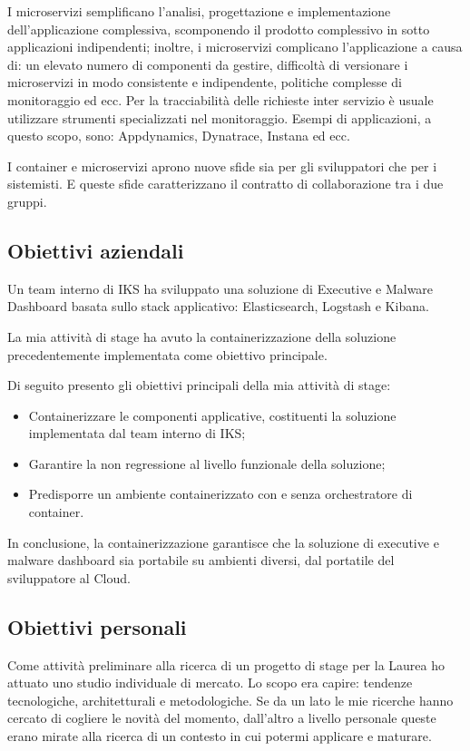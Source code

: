I microservizi semplificano l'analisi, progettazione e implementazione dell'applicazione complessiva, scomponendo il prodotto complessivo in sotto applicazioni indipendenti; inoltre, i microservizi complicano l'applicazione a causa di: un elevato numero di componenti da gestire, difficoltà di versionare i microservizi in modo consistente e indipendente, politiche complesse di monitoraggio ed ecc. Per la tracciabilità delle richieste inter servizio è usuale utilizzare strumenti specializzati nel monitoraggio. Esempi di applicazioni, a questo scopo, sono: Appdynamics, Dynatrace, Instana ed ecc. 

I container e microservizi aprono nuove sfide sia per gli sviluppatori che per i sistemisti. E queste sfide caratterizzano il contratto di collaborazione tra i due gruppi. 




\subsection{Obiettivi aziendali}

Un team interno di IKS ha sviluppato una soluzione di Executive e Malware Dashboard
basata sullo stack applicativo: Elasticsearch, Logstash e Kibana.
 
La mia attività di stage ha avuto la containerizzazione della soluzione precedentemente implementata come obiettivo principale.

Di seguito presento gli obiettivi principali della mia attività di stage:

\begin{itemize}
	\item Containerizzare le componenti applicative, costituenti la soluzione implementata dal team interno di IKS; 
	\item Garantire la non regressione al livello funzionale della soluzione;
	\item Predisporre un ambiente containerizzato con e senza orchestratore di container.
\end{itemize} 

In conclusione, la containerizzazione garantisce che la soluzione di executive e malware dashboard sia portabile su ambienti diversi, dal portatile del sviluppatore al Cloud.  

\subsection{Obiettivi personali}
Come attività preliminare alla ricerca di un progetto di stage per la Laurea ho 
attuato uno studio individuale di mercato. Lo scopo era capire: tendenze 
tecnologiche, architetturali e metodologiche. Se da un lato le mie ricerche 
hanno cercato di cogliere le novità del momento, dall'altro a livello personale 
queste erano mirate alla ricerca di un contesto in cui potermi applicare e maturare. 

